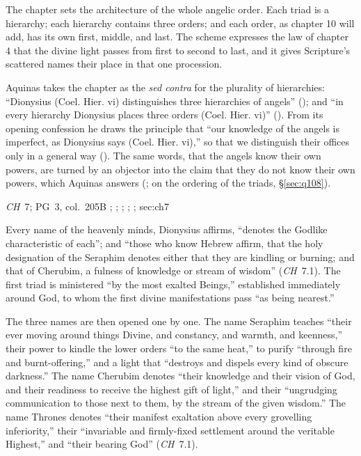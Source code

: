 The chapter sets the architecture of the whole angelic order. Each triad
is a hierarchy; each hierarchy contains three orders; and each order,
as chapter 10 will add, has its own first, middle, and last. The scheme
expresses the law of chapter 4 that the divine light passes from first
to second to last, and it gives Scripture's scattered names their place
in that one procession.

Aquinas takes the chapter as the \emph{sed contra} for the plurality of
hierarchies: ``Dionysius (Coel. Hier. vi) distinguishes three hierarchies
of angels'' (); and ``in every hierarchy Dionysius
places three orders (Coel. Hier. vi)'' (). From
its opening confession he draws the principle that ``our knowledge of the
angels is imperfect, as Dionysius says (Coel. Hier. vi),'' so that we
distinguish their offices only in a general way ().
The same words, that the angels know their own powers, are turned by an
objector into the claim that they do not know their own powers, which
Aquinas answers (; on the ordering of the triads, \S\ref{sec:q108}).

{\emph{CH}~7; PG~3, col.~205B}
{; ; ; ; ;
}{sec:ch7}

Every name of the heavenly minds, Dionysius affirms, ``denotes the
Godlike characteristic of each''; and ``those who know Hebrew affirm,
that the holy designation of the Seraphim denotes either that they are
kindling or burning; and that of Cherubim, a fulness of knowledge or
stream of wisdom'' (\emph{CH}~7.1). The first triad is ministered ``by
the most exalted Beings,'' established immediately around God, to whom
the first divine manifestations pass ``as being nearest.''

The three names are then opened one by one. The name Seraphim teaches
``their ever moving around things Divine, and constancy, and warmth, and
keenness,'' their power to kindle the lower orders ``to the same heat,''
to purify ``through fire and burnt-offering,'' and a light that ``destroys
and dispels every kind of obscure darkness.'' The name Cherubim denotes
``their knowledge and their vision of God, and their readiness to receive
the highest gift of light,'' and their ``ungrudging communication to those
next to them, by the stream of the given wisdom.'' The name Thrones
denotes ``their manifest exaltation above every grovelling inferiority,''
their ``invariable and firmly-fixed settlement around the veritable
Highest,'' and ``their bearing God'' (\emph{CH}~7.1).

